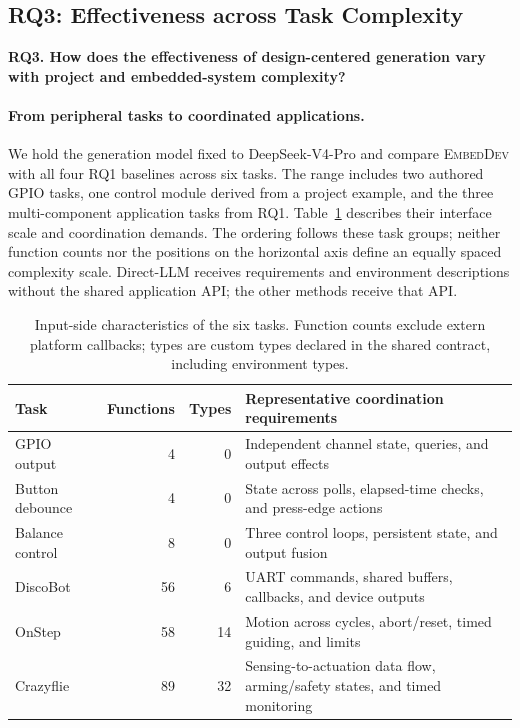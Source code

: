 \subsection{RQ3: Effectiveness across Task Complexity}
\label{sec:rq3-complexity}
\textbf{RQ3. How does the effectiveness of design-centered generation vary with project and embedded-system complexity?}

\paragraph{From peripheral tasks to coordinated applications.}
We hold the generation model fixed to DeepSeek-V4-Pro and compare \textsc{EmbedDev} with all four RQ1 baselines across six tasks. The range includes two authored GPIO tasks, one control module derived from a project example, and the three multi-component application tasks from RQ1. Table~\ref{tab:rq3-profiles} describes their interface scale and coordination demands. The ordering follows these task groups; neither function counts nor the positions on the horizontal axis define an equally spaced complexity scale. Direct-LLM receives requirements and environment descriptions without the shared application API; the other methods receive that API.

\begin{table}[!htbp]
\centering\small
\caption{Input-side characteristics of the six tasks. Function counts exclude extern platform callbacks; types are custom types declared in the shared contract, including environment types.}
\label{tab:rq3-profiles}
\begin{tabularx}{\linewidth}{@{}lrrX@{}}\toprule
Task & Functions & Types & Representative coordination requirements\\\midrule
GPIO output & 4 & 0 & Independent channel state, queries, and output effects\\
Button debounce & 4 & 0 & State across polls, elapsed-time checks, and press-edge actions\\
Balance control & 8 & 0 & Three control loops, persistent state, and output fusion\\
DiscoBot & 56 & 6 & UART commands, shared buffers, callbacks, and device outputs\\
OnStep & 58 & 14 & Motion across cycles, abort/reset, timed guiding, and limits\\
Crazyflie & 89 & 32 & Sensing-to-actuation data flow, arming/safety states, and timed monitoring\\
\bottomrule\end{tabularx}
\end{table}

